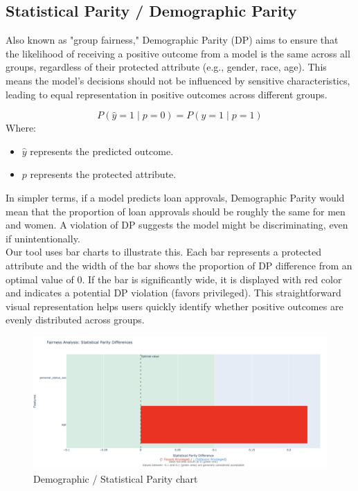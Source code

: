 \documentclass[runningheads]{llncs}
\begin{document}
\subsection{Statistical Parity / Demographic Parity}
Also known as "group fairness," Demographic Parity (DP) aims to ensure that the likelihood of receiving a positive outcome from a model is the same across all groups, regardless of their protected attribute (e.g., gender, race, age). This means the model's decisions should not be influenced by sensitive characteristics, leading to equal representation in positive outcomes across different groups.

\begin{equation}
P(\hat{y} = 1 \mid p=0) = P(\hat{y} = 1 \mid p=1)
\end{equation}
Where:
\begin{itemize}
    \item $\hat{y}$ represents the predicted outcome.
    \item $p$ represents the protected attribute.
\end{itemize}

In simpler terms, if a model predicts loan approvals, Demographic Parity would mean that the proportion of loan approvals should be roughly the same for men and women. A violation of DP suggests the model might be discriminating, even if unintentionally.\\

Our tool uses bar charts to illustrate this. Each bar represents a protected attribute and the width of the bar shows the proportion of DP difference from an optimal value of 0. If the bar is significantly wide, it is displayed with red color and indicates a potential DP violation (favors privileged). This straightforward visual representation helps users quickly identify whether positive outcomes are evenly distributed across groups.

\begin{figure}
\centering
\includegraphics[width=1\textwidth]{images/sp-chart.png}
\caption{Demographic / Statistical Parity chart} \label{sp-chart}
\end{figure}
\end{document}
